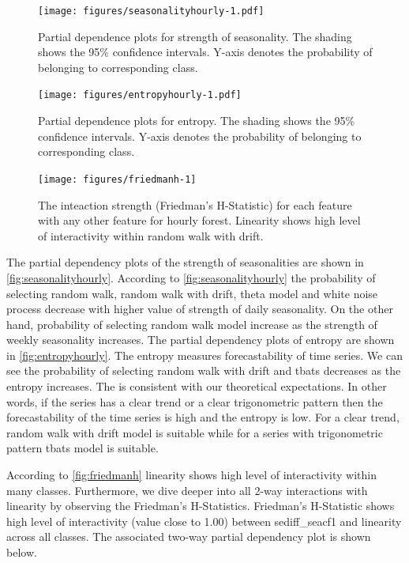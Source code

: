 \documentclass[11pt,a4paper,]{article}
\begin{document}
\begin{figure}
\centering
\texttt{[image: figures/seasonalityhourly-1.pdf]}
\caption{\label{fig:seasonalityhourly}Partial dependence plots for strength of seasonality. The shading shows the 95\% confidence intervals. Y-axis denotes the probability of belonging to corresponding class.}
\end{figure}

\begin{figure}
\centering
\texttt{[image: figures/entropyhourly-1.pdf]}
\caption{\label{fig:entropyhourly}Partial dependence plots for entropy. The shading shows the 95\% confidence intervals. Y-axis denotes the probability of belonging to corresponding class.}
\end{figure}

\begin{figure}[h]

{\centering \texttt{[image: figures/friedmanh-1]} 

}

\caption{The inteaction strength (Friedman's H-Statistic) for each feature with any other feature for hourly forest. Linearity shows high level of interactivity within random walk with drift.}\label{fig:friedmanh}
\end{figure}

The partial dependency plots of the strength of seasonalities are shown in \autoref{fig:seasonalityhourly}. According to \autoref{fig:seasonalityhourly} the probability of selecting random walk, random walk with drift, theta model and white noise process decrease with higher value of strength of daily seasonality. On the other hand, probability of selecting random walk model increase as the strength of weekly seasonality increases. The partial dependency plots of entropy are shown in \autoref{fig:entropyhourly}. The entropy measures forecastability of time series. We can see the probability of selecting random walk with drift and tbats decreases as the entropy increases. The is consistent with our theoretical expectations. In other words, if the series has a clear trend or a clear trigonometric pattern then the forecastability of the time series is high and the entropy is low. For a clear trend, random walk with drift model is suitable while for a series with trigonometric pattern tbats model is suitable.

According to \autoref{fig:friedmanh} linearity shows high level of interactivity within many classes. Furthermore, we dive deeper into all 2-way interactions with linearity by observing the Friedman's H-Statistics. Friedman's H-Statistic shows high level of interactivity (value close to 1.00) between sediff\_seacf1 and linearity across all classes. The associated two-way partial dependency plot is shown below.
\end{document}
